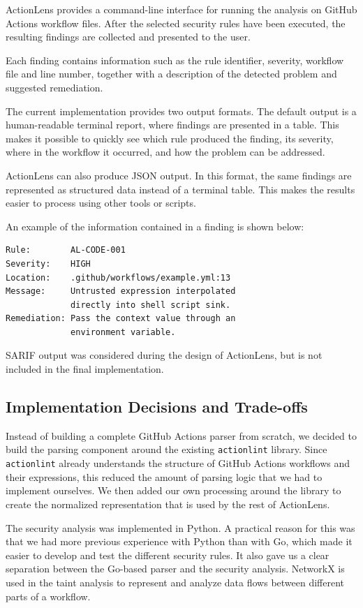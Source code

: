 \documentclass{article}
\begin{document}
ActionLens provides a command-line interface for running the analysis on GitHub Actions workflow files. After the selected security rules have been executed, the resulting findings are collected and presented to the user.

Each finding contains information such as the rule identifier, severity,
workflow file and line number, together with a description of the detected
problem and suggested remediation.

The current implementation provides two output formats. The default output is
a human-readable terminal report, where findings are presented in a table. This makes it possible to quickly see which rule produced the finding, its
severity, where in the workflow it occurred, and how the problem can be
addressed.

ActionLens can also produce JSON output. In this format, the same findings are represented as structured data instead of a terminal table. This makes the results easier to process using other tools or scripts.

An example of the information contained in a finding is shown below: 
\begin{verbatim}
Rule:        AL-CODE-001
Severity:    HIGH
Location:    .github/workflows/example.yml:13
Message:     Untrusted expression interpolated
             directly into shell script sink.
Remediation: Pass the context value through an
             environment variable.
\end{verbatim}

SARIF output was considered during the design of ActionLens, but is not included in the final implementation.

\subsection{Implementation Decisions and Trade-offs}

Instead of building a complete GitHub Actions parser from scratch, we decided to build the parsing component around the existing \texttt{actionlint} library. Since \texttt{actionlint} already understands the structure of GitHub Actions workflows and their expressions, this reduced the amount of parsing logic that we had to implement ourselves. We then added our own processing around the library to create the normalized representation that is used by the rest of ActionLens.

The security analysis was implemented in Python. A practical reason for this was that we had more previous experience with Python than with Go, which made it easier to develop and test the different security rules. It also gave us a clear separation between the Go-based parser and the security analysis. NetworkX is used in the taint analysis to represent and analyze data flows between different parts of a workflow.
\end{document}
